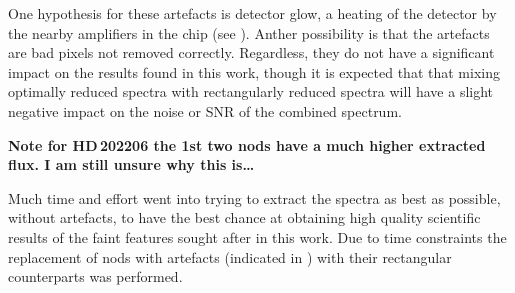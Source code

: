 One hypothesis for these artefacts is detector glow, a heating of the detector by the nearby amplifiers in the chip (see ).
Anther possibility is that the artefacts are bad pixels not removed correctly.
Regardless, they do not have a significant impact on the results found in this work, though it is expected that that mixing optimally reduced spectra with rectangularly reduced spectra will have a slight negative impact on the noise or SNR of the combined spectrum.

\textbf{Note for HD\,202206 the 1st two nods have a much higher extracted flux.
I am still unsure why this is\ldots{}}


Much time and effort went into trying to extract the spectra as best as possible, without artefacts, to have the best chance at obtaining high quality scientific results of the faint features sought after in this work.
Due to time constraints the replacement of nods with artefacts (indicated in ) with their rectangular counterparts was performed.

